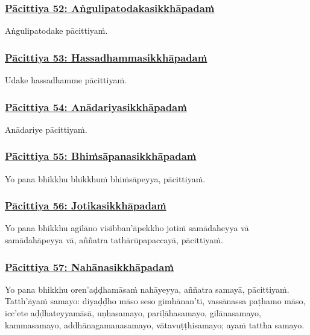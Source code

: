 \subsubsection*{\hyperref[exp52]{Pācittiya 52: Aṅgulipatodakasikkhāpadaṁ}}
\label{pac52}

Aṅgulipatodake pācittiyaṁ.



\subsubsection*{\hyperref[exp53]{Pācittiya 53: Hassadhammasikkhāpadaṁ}}
\label{pac53}

Udake hassadhamme pācittiyaṁ.



\subsubsection*{\hyperref[exp54]{Pācittiya 54: Anādariyasikkhāpadaṁ}}
\label{pac54}

Anādariye pācittiyaṁ.



\subsubsection*{\hyperref[exp55]{Pācittiya 55: Bhiṁsāpanasikkhāpadaṁ}}
\label{pac55}

Yo pana bhikkhu bhikkhuṁ bhiṁsāpeyya, pācittiyaṁ.



\subsubsection*{\hyperref[exp56]{Pācittiya 56: Jotikasikkhāpadaṁ}}
\label{pac56}

Yo pana bhikkhu agilāno visibban'āpekkho jotiṁ samādaheyya vā samādahāpeyya vā, aññatra tathārūpapaccayā, pācittiyaṁ.



\subsubsection*{\hyperref[exp57]{Pācittiya 57: Nahānasikkhāpadaṁ}}
\label{pac57}

Yo pana bhikkhu oren'aḍḍhamāsaṁ nahāyeyya, aññatra samayā, pācittiyaṁ. Tatth'āyaṁ samayo: diyaḍḍho māso seso gimhānan'ti, vassānassa paṭhamo māso, icc'ete aḍḍhateyyamāsā, uṇhasamayo, pariḷāhasamayo, gilānasamayo, kammasamayo, addhānagamanasamayo, vātavuṭṭhisamayo; ayaṁ tattha samayo.



